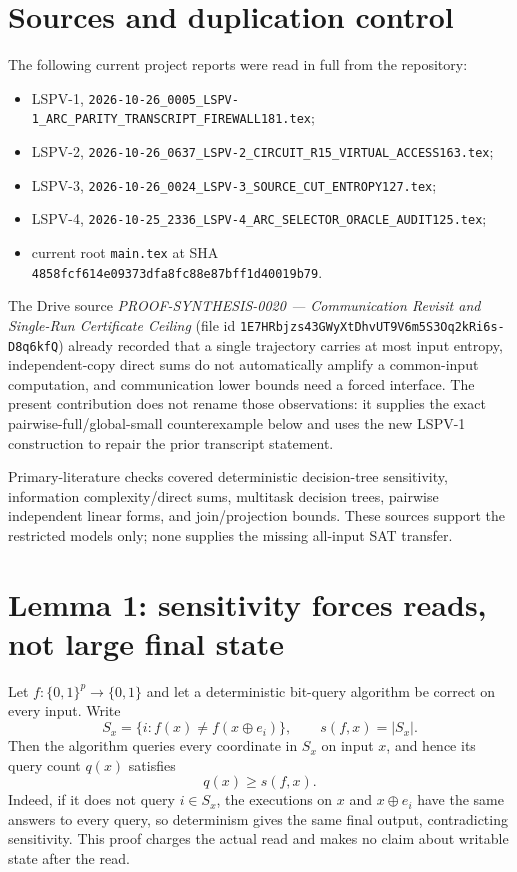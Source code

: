 \documentclass[11pt]{article}
\begin{document}
\section*{Sources and duplication control}
The following current project reports were read in full from the repository:
\begin{itemize}
  \item LSPV-1, \texttt{2026-10-26\_0005\_LSPV-1\_ARC\_PARITY\_TRANSCRIPT\_FIREWALL181.tex};
  \item LSPV-2, \texttt{2026-10-26\_0637\_LSPV-2\_CIRCUIT\_R15\_VIRTUAL\_ACCESS163.tex};
  \item LSPV-3, \texttt{2026-10-26\_0024\_LSPV-3\_SOURCE\_CUT\_ENTROPY127.tex};
  \item LSPV-4, \texttt{2026-10-25\_2336\_LSPV-4\_ARC\_SELECTOR\_ORACLE\_AUDIT125.tex};
  \item current root \texttt{main.tex} at SHA
        \texttt{4858fcf614e09373dfa8fc88e87bff1d40019b79}.
\end{itemize}
The Drive source \emph{PROOF-SYNTHESIS-0020 --- Communication Revisit and
Single-Run Certificate Ceiling} (file id
\texttt{1E7HRbjzs43GWyXtDhvUT9V6m5S3Oq2kRi6s-D8q6kfQ}) already recorded that a
single trajectory carries at most input entropy, independent-copy direct sums
do not automatically amplify a common-input computation, and communication
lower bounds need a forced interface.  The present contribution does not
rename those observations: it supplies the exact pairwise-full/global-small
counterexample below and uses the new LSPV-1 construction to repair the prior
transcript statement.

Primary-literature checks covered deterministic decision-tree sensitivity,
information complexity/direct sums, multitask decision trees, pairwise
independent linear forms, and join/projection bounds.  These sources support
the restricted models only; none supplies the missing all-input SAT transfer.

\section*{Lemma 1: sensitivity forces reads, not large final state}
Let $f:\{0,1\}^p\to\{0,1\}$ and let a deterministic bit-query algorithm be
correct on every input.  Write
\[
  S_x=\{i:f(x)\ne f(x\oplus e_i)\},\qquad s(f,x)=|S_x|.
\]
Then the algorithm queries every coordinate in $S_x$ on input $x$, and hence
its query count $q(x)$ satisfies
\[
  q(x)\ge s(f,x).
\]
Indeed, if it does not query $i\in S_x$, the executions on $x$ and
$x\oplus e_i$ have the same answers to every query, so determinism gives the
same final output, contradicting sensitivity.  This proof charges the actual
read and makes no claim about writable state after the read.
\end{document}
